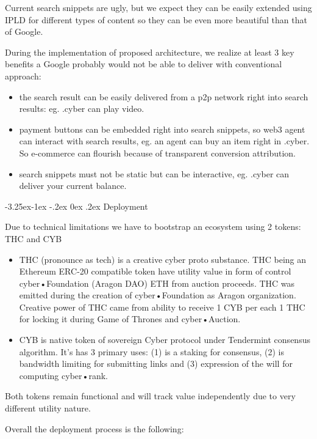 \documentclass[8pt,oneside]{amsart}
\makeatletter
\renewcommand\subsection{\@startsection{subsection}{2}{\z@}%
                                     {-3.25ex\@plus -1ex \@minus -.2ex}%
                                     {0ex \@plus .2ex}%
                                     {\play\Large}}%
\newcommand{\titleSection}[1]{\subsection{#1}}
\newcommand{\code}[1]{{\PlayBold #1}}
\makeatother
\begin{document}
Current search snippets are ugly, but we expect they can be easily extended using IPLD for different types of content so they can be even more beautiful than that of Google.

During the implementation of proposed architecture, we realize at least 3 key benefits a Google probably would not be able to deliver with conventional approach:

\begin{itemize}
\item the search result can be easily delivered from a p2p network right into search results: eg. .cyber can play video.
\item payment buttons can be embedded right into search snippets, so web3 agent can interact with search results, eg. an agent can buy an item right in \code{.cyber}. So e-commerce can flourish because of transparent conversion attribution.
\item search snippets must not be static but can be interactive, eg. \code{.cyber} can deliver your current balance.
\end{itemize}

\titleSection{Deployment}\label{deployment}

Due to technical limitations we have to bootstrap an ecosystem using 2 tokens: THC and CYB

\begin{itemize}
\item THC (pronounce as tech) is a creative cyber proto substance. THC being an Ethereum ERC-20 compatible token have utility value in form of control cyber•Foundation (Aragon DAO) ETH from auction proceeds. THC was emitted during the creation of cyber•Foundation as Aragon organization. Creative power of THC came from ability to receive 1 CYB per each 1 THC for locking it during Game of Thrones and cyber•Auction.
\item CYB is native token of sovereign Cyber protocol under Tendermint consensus algorithm. It's has 3 primary uses: (1) is a staking for consensus, (2) is bandwidth limiting for submitting links and (3) expression of the will for computing cyber•rank.
\end{itemize}

Both tokens remain functional and will track value independently due to very different utility nature.

Overall the deployment process is the following:
\end{document}
